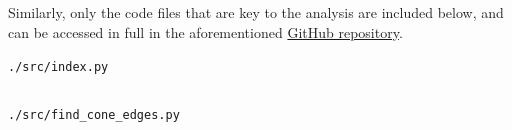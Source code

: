 Similarly, only the code files that are key to the analysis are included below, and can be accessed in full in the aforementioned \href{https://www.github.com/vaisriv/enae464-lab05}{GitHub repository}.

\begin{codeblock}
    \centering
    \caption{Data Analysis Script.}
    \texttt{./src/index.py}
    \inputminted{python}{../src/index.py}
    \label{lst:appendices/code/index}
\end{codeblock}

\begin{codeblock}
    \centering
    \caption{Automated Edge Detection Script.}
    \texttt{./src/find_cone_edges.py}
    \inputminted{python}{../src/find_cone_edges.py}
    \label{lst:appendices/code/find_cone_edges}
\end{codeblock}

\nocite{*}


